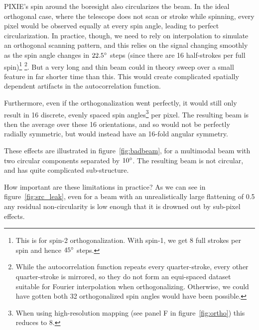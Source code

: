 \documentclass{article}
\begin{document}
PIXIE's spin around the boresight also circularizes the beam. In the ideal
orthogonal case, where the telescope does not scan or stroke while spinning, every
pixel would be observed equally at every spin angle, leading to perfect
circularization. In practice, though, we need to rely on interpolation to
simulate an orthogonal scanning pattern, and this relies on the signal changing
smoothly as the spin angle changes in $22.5\degree$ steps (since there are 16
half-strokes per full spin)\footnote{This is for spin-2 orthogonalization.
With spin-1, we get 8 full strokes per spin and hence $45\degree$ steps.}
\footnote{While the autocorrelation function repeats
every quarter-stroke, every other quarter-stroke is mirrored, so they do not
form an equi-spaced dataset suitable for Fourier interpolation when orthogonalizing.
Otherwise, we could have gotten both 32 orthogonalized spin angles would have been
possible.}.
But a very long and thin beam could in theory sweep
over a small feature in far shorter time than this. This would create
complicated spatially dependent artifacts in the autocorrelation function.

Furthermore, even if the orthogonalization went perfectly, it would still only
result in 16 discrete, evenly spaced spin angles\footnote{When using
high-resolution mapping (see panel F in figure~\ref{fig:ortho}) this reduces to
8.} per pixel. The resulting beam is then the average over these 16
orientations, and so would not be perfectly radially symmetric, but would
instead have an 16-fold angular symmetry.

These effects are illustrated in figure~\ref{fig:badbeam}, for a
multimodal beam with two circular components separated by $10\degree$.
The resulting beam is not circular, and has quite complicated sub-structure.

How important are these limitations in practice? As we can see in
figure~\ref{fig:src_leak}, even for a beam with an unrealistically large
flattening of 0.5 any residual non-circularity is low enough
that it is drowned out by sub-pixel effects.
\end{document}
